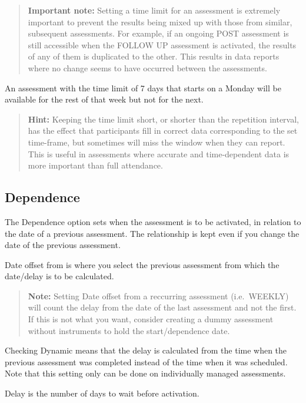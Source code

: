 \documentclass[]{book}
\begin{document}
\begin{quote}
\textbf{Important note:} Setting a time limit for an assessment is extremely important to prevent the results being mixed up with those from similar, subsequent assessments. For example, if an ongoing POST assessment is still accessible when the FOLLOW UP assessment is activated, the results of any of them is duplicated to the other. This results in data reports where no change seems to have occurred between the assessments.
\end{quote}

An assessment with the time limit of 7 days that starts on a Monday will be available for the rest of that week but not for the next.

\begin{quote}
\textbf{Hint:} Keeping the time limit short, or shorter than the repetition interval, has the effect that participants fill in correct data corresponding to the set time-frame, but sometimes will miss the window when they can report. This is useful in assessments where accurate and time-dependent data is more important than full attendance.
\end{quote}

\hypertarget{dependence}{%
\subsection{Dependence}\label{dependence}}

The Dependence option sets when the assessment is to be activated, in relation to the date of a previous assessment. The relationship is kept even if you change the date of the previous assessment.

Date offset from is where you select the previous assessment from which the date/delay is to be calculated.

\begin{quote}
\textbf{Note:} Setting Date offset from a reccurring assessment (i.e.~WEEKLY) will count the delay from the date of the last assessment and not the first. If this is not what you want, consider creating a dummy assessment without instruments to hold the start/dependence date.
\end{quote}

Checking Dynamic means that the delay is calculated from the time when the previous assessment was completed instead of the time when it was scheduled. Note that this setting only can be done on individually managed assessments.

Delay is the number of days to wait before activation.
\end{document}
